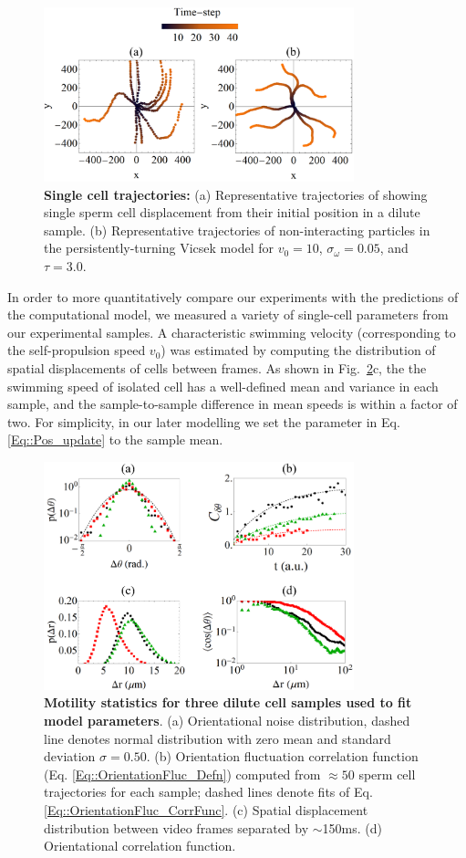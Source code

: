 \documentclass[reprint,unsortedaddress,amsmath,amssymb,aps,pre]{revtex4-2}
\begin{document}
\begin{figure}[htb]
    \centering
    \includegraphics[width=90mm]{fig_SingleCell_Trajectories.png}
    \caption{\label{fig::PersistentTurning}
    \textbf{Single cell trajectories:} (a) Representative trajectories of showing single sperm cell displacement from their initial position in a dilute sample. (b) Representative trajectories of non-interacting particles in the persistently-turning Vicsek model for $v_{0}=10$, $\sigma_{\omega}=0.05$, and $\tau=3.0$.}
\end{figure}


In order to more quantitatively compare our experiments with the predictions of the computational model, we measured a variety of single-cell parameters from our experimental samples. A characteristic swimming velocity (corresponding to the self-propulsion speed $v_0$) was estimated by computing the distribution of spatial displacements of cells between frames. As shown in Fig.~\ref{fig::VicsekModelFitting}c, the the swimming speed of isolated cell has a well-defined mean and variance in each sample, and the sample-to-sample difference in mean speeds is within a factor of two. For simplicity, in our later modelling we set the parameter in Eq. \ref{Eq::Pos_update} to the sample mean. 


\begin{figure}[htb]
    \centering
    \includegraphics[width=90mm]{fig_SingleCell_Statistics.PNG}
    \caption{\label{fig::VicsekModelFitting}
    \textbf{Motility statistics for three dilute cell samples used to fit model parameters}. (a) Orientational noise distribution, dashed line denotes normal distribution with zero mean and standard deviation $\sigma=0.50$. (b) Orientation fluctuation correlation function (Eq. \ref{Eq::OrientationFluc_Defn}) computed from $\approx50$ sperm cell trajectories for each sample; dashed lines denote fits of Eq. \ref{Eq::OrientationFluc_CorrFunc}. (c) Spatial displacement distribution between video frames separated by $\sim$150ms. (d) Orientational correlation function. }
\end{figure}
\end{document}
